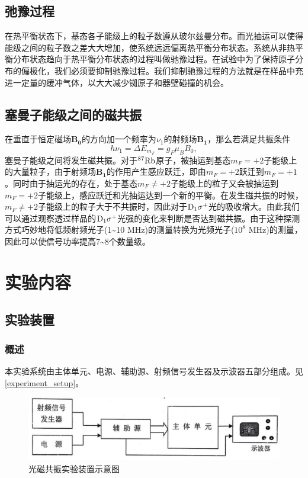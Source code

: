 \documentclass[font=default]{mpltx}
\begin{document}
\subsection{弛豫过程}
在热平衡状态下，基态各子能级上的粒子数遵从玻尔兹曼分布。而光抽运可以使得能级之间的粒子数之差大大增加，使系统远远偏离热平衡分布状态。系统从非热平衡分布状态趋向于热平衡分布状态的过程叫做驰豫过程。在试验中为了保持原子分布的偏极化，我们必须要抑制驰豫过程。我们抑制驰豫过程的方法就是在样品中充进一定量的缓冲气体，以大大减少铷原子和器壁碰撞的机会。
\subsection{塞曼子能级之间的磁共振}
在垂直于恒定磁场$\bm{B_0}$的方向加一个频率为$\nu_1$的射频场$\bm{B_1}$，那么若满足共振条件
\begin{equation}\label{resonance_cond}
  h\nu_1=\Delta E_{m_F}=g_F\mu_B B_0,
\end{equation}
塞曼子能级之间将发生磁共振。对于${\rm ^{87}Rb}$原子，被抽运到基态$m_F=+2$子能级上的大量粒子，由于射频场$\bm{B_1}$的作用产生感应跃迁，即由$m_F=+2$跃迁到$m_F=+1$。同时由于抽运光的存在，处于基态$m_F\neq+2$子能级上的粒子又会被抽运到$m_F=+2$子能级上，感应跃迁和光抽运达到一个新的平衡。在发生磁共振的时候，$m_F\neq+2$子能级上的粒子大于不共振时，因此对于${\rm D_1\sigma^+}$光的吸收增大。由此我们可以通过观察透过样品的${\rm D_1\sigma^+}$光强的变化来判断是否达到磁共振。由于这种探测方式巧妙地将低频射频光子(1\textasciitilde10 MHz)的测量转换为光频光子($10^8$ MHz)的测量，因此可以使信号功率提高7\textasciitilde8个数量级。
\section{实验内容}
\subsection{实验装置\cite{manual}}
\subsubsection{概述}
本实验系统由主体单元、电源、辅助源、射频信号发生器及示波器五部分组成。见\autoref{experiment_setup}。
\begin{figure}[h]
  \centering
  \includegraphics[width=0.6\linewidth]{fig/experiment_setup.jpg}
  \caption{光磁共振实验装置示意图}
  \label{experiment_setup}
\end{figure}
\end{document}
